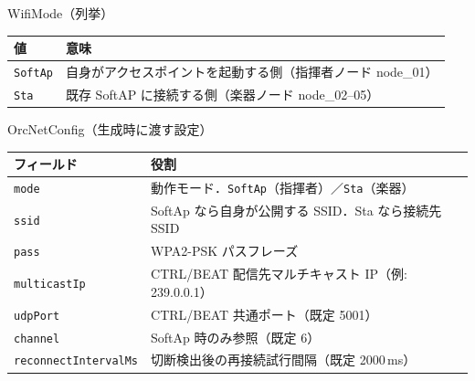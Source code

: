 \documentclass[lualatex,book,paper=a4paper,jafontsize=11.5pt,jafontscale=1.05]{jlreq}
\begin{document}
\begin{apibox}{WifiMode（列挙）}
\begin{tabular}{l p{}}
\toprule
\textbf{値} & \textbf{意味} \\
\midrule
\texttt{SoftAp} & 自身がアクセスポイントを起動する側（指揮者ノード node\_01） \\
\texttt{Sta}    & 既存 SoftAP に接続する側（楽器ノード node\_02--05） \\
\bottomrule
\end{tabular}
\end{apibox}

\begin{apibox}{OrcNetConfig（生成時に渡す設定）}
\begin{tabular}{l p{}}
\toprule
\textbf{フィールド} & \textbf{役割} \\
\midrule
\texttt{mode}                & 動作モード．\texttt{SoftAp}（指揮者）／\texttt{Sta}（楽器） \\
\texttt{ssid}                & SoftAp なら自身が公開する SSID．Sta なら接続先 SSID \\
\texttt{pass}                & WPA2-PSK パスフレーズ \\
\texttt{multicastIp}         & CTRL/BEAT 配信先マルチキャスト IP（例: 239.0.0.1） \\
\texttt{udpPort}             & CTRL/BEAT 共通ポート（既定 5001） \\
\texttt{channel}             & SoftAp 時のみ参照（既定 6） \\
\texttt{reconnectIntervalMs} & 切断検出後の再接続試行間隔（既定 2000\,ms） \\
\bottomrule
\end{tabular}
\end{apibox}
\end{document}
